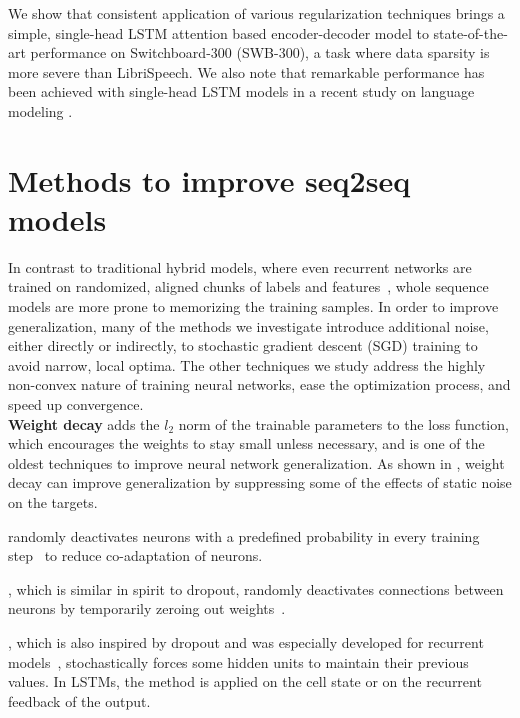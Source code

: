 \documentclass[a4paper]{article}
\begin{document}
We show that consistent application of various regularization techniques brings a simple, single-head LSTM attention based encoder-decoder model to state-of-the-art performance on Switchboard-300 (SWB-300), a task where data sparsity is more severe than LibriSpeech.
We also note that remarkable performance has been achieved with single-head LSTM models in a recent study on language modeling \cite{Merity2019}.












\renewcommand{\baselinestretch}{0.941}\normalsize
\section{Methods to improve seq2seq models}
\label{sec:methods}
In contrast to traditional hybrid models, where even recurrent networks are trained on randomized, aligned chunks of labels and features~\cite{Saon2014,Mohamed2015}, whole sequence models are more prone to memorizing the training samples.
In order to improve generalization, many of the methods we investigate introduce additional noise, either directly or indirectly, to stochastic gradient descent (SGD) training to avoid narrow, local optima.
The other techniques we study address the highly non-convex nature of training neural networks, ease the optimization process, and speed up convergence.
\\ {\bf Weight decay} adds the $l_2$ norm of the trainable parameters to the loss function, which encourages the weights to stay small unless necessary, and is one of the oldest techniques to improve neural network generalization.
As shown in \cite{Krogh1992}, weight decay can improve generalization by suppressing some of the effects of static noise on the targets.

 randomly deactivates neurons with a predefined probability in every training step~\cite{hinton2012} to reduce co-adaptation of neurons.

, which is similar in spirit to dropout, randomly deactivates connections between neurons by temporarily zeroing out weights~\cite{pmlr-v28-wan13}.

, which is also inspired by dropout and was especially developed for recurrent models~\cite{Krueger2017}, stochastically forces some hidden units to maintain their previous values.
In LSTMs, the method is applied on the cell state or on the recurrent feedback of the output.
\end{document}
